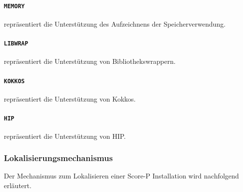 \documentclass[german,proseminar,hyperref,utf8,lof]{zihpub}
\begin{document}
    \paragraph{\texttt{MEMORY}} repräsentiert die Unterstützung des Aufzeichnens der Speicherverwendung.

    \paragraph{\texttt{LIBWRAP}} repräsentiert die Unterstützung von Bibliothekswrappern.

    \paragraph{\texttt{KOKKOS}} repräsentiert die Unterstützung von Kokkos.

    \paragraph{\texttt{HIP}} repräsentiert die Unterstützung von HIP.

    \subsubsection{Lokalisierungsmechanismus}
    Der Mechanismus zum Lokalisieren einer Score-P Installation wird nachfolgend erläutert.
\end{document}
